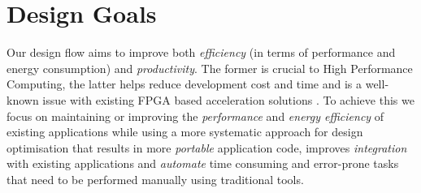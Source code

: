 \begin{comment}
\section{Overview}

Figure \ref{fig:design-flow-overview} provides a brief overview of the
proposed design flow. First a high level application is produced as
the input to our flow. This is then partitioned into a software part
and a hardware part to run on the dataflow accelerator. A dataflow
kernel is generated from the original description. Aspect descriptions
are used to control the optimisation process.

Thus the inputs to the design flow are:
\begin{itemize}
\item High-level source specification
\item Aspect descriptions for controlling the compilation process
\end{itemize}

\begin{figure}[!h]
  \texttt{[image: figs/asap13-design-flow.pdf\_tex]}
  \caption{Proposed approach for aspect-driven compilation of dataflow
    designs.}
  \label{fig:design-flow-overview}
\end{figure}

The design flow produces as its output a number of implementations based on
requirements specified through aspects.

The following algorithm describes the operation of the proposed design flow:

\begin{lstlisting}
  for (in as do als)
\end{lstlisting}
\end{comment}

\section{Design Goals}

Our design flow aims to improve both \emph{efficiency} (in terms of
performance and energy consumption) and \emph{productivity}. The
former is crucial to High Performance Computing, the latter helps
reduce development cost and time and is a well-known issue with
existing FPGA based acceleration solutions \cite{jones2010gpu}. To
achieve this we focus on maintaining or improving the
\emph{performance} and \emph{energy efficiency} of existing
applications while using a more systematic approach for design
optimisation that results in more \emph{portable} application code,
improves \emph{integration} with existing applications and
\emph{automate} time consuming and error-prone tasks that need to be
performed manually using traditional tools.


